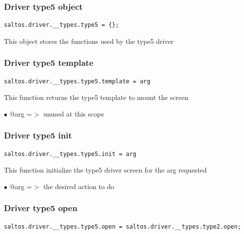 \documentclass[a4paper]{article}
\begin{document}
\hypertarget{toc201}{}
\subsubsection{Driver type5 object}

\begin{lstlisting}
saltos.driver.__types.type5 = {};
\end{lstlisting}

This object stores the functions used by the type5 driver

\hypertarget{toc202}{}
\subsubsection{Driver type5 template}

\begin{lstlisting}
saltos.driver.__types.type5.template = arg
\end{lstlisting}

This function returns the type5 template to mount the screen

\begin{compactitem}
\item[\color{myblue}$\bullet$] @arg =$>$ unused at this scope
\end{compactitem}

\hypertarget{toc203}{}
\subsubsection{Driver type5 init}

\begin{lstlisting}
saltos.driver.__types.type5.init = arg
\end{lstlisting}

This function initialize the type5 driver screen for the arg requested

\begin{compactitem}
\item[\color{myblue}$\bullet$] @arg =$>$ the desired action to do
\end{compactitem}

\hypertarget{toc204}{}
\subsubsection{Driver type5 open}

\begin{lstlisting}
saltos.driver.__types.type5.open = saltos.driver.__types.type2.open;
\end{lstlisting}
\end{document}
